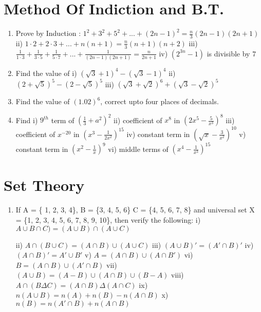 \documentclass[14pt]{article}
\begin{document}
\begin{multicols}{2}
\section{Method Of Indiction and B.T.}
\noindent
\begin{enumerate}[resume]


\item Prove by Induction : $1^2+3^2+5^2+...+(2n-1)^2 = \frac{n}{3}(2n-1)(2n+1)$ ii) $1\cdot2+2\cdot3+...+n(n+1) = \frac{n}{3}(n+1)(n+2)$ iii) $\frac{1}{1\cdot3}+\frac{1}{3\cdot5}+\frac{1}{5\cdot7}+...+\frac{1}{(2n-1)(2n+1)} = \frac{n}{2n+1}$ iv) $(2^{3n}-1)$ is divisible by 7

\item Find the value of i) $\left(\sqrt{3}+1\right)^4 - \left(\sqrt{3}-1\right)^4$ 
ii) $\left(2+\sqrt{5}\right)^5 - \left(2 -\sqrt{5}\right)^5$ iii) $\left(\sqrt{3}+\sqrt{2}\right)^6 + \left(\sqrt{3} -\sqrt{2}\right)^5$ 

\item Find the value of $(1.02)^6$, correct upto four places of decimals.

\item Find i) $9^{th}$ term of $\left(\frac{1}{3}+a^2\right)^2$ ii) coefficient of $x^8$ in $\left(2x^5 - \frac{5}{x^3}\right)^8$ iii) coefficient of $x^{-20}$ in $\left(x^3 - \frac{1}{2x^2}\right)^{15}$
iv) constant term in $\left(\sqrt{x} - \frac{3}{x^2}\right)^{10}$ v) constant term in $\left(x^2 - \frac{1}{x}\right)^9$
vi) middle terms of $\left(x^4 - \frac{1}{x^3}\right)^{15}$

\end{enumerate} 


\section{Set Theory}
\noindent
\begin{enumerate}[resume]

\item  If A = \{ 1, 2, 3, 4\}, B = \{3, 4, 5, 6\}
		  C = \{4, 5, 6, 7, 8\} and universal set  X = \{1, 2, 3, 4, 5, 6, 7, 8, 9, 10\}, then verify
the following:
i)		$ A \cup B\cap C) = (A\cup B) \cap (A \cup C)$

ii)	$A\cap (B\cup C)=(A\cap B)\cup (A \cup C)$
iii) $(A\cup B)' = (A'\cap B)'         $
iv)	$ (A\cap B)' = A'\cup B'          $
v)	$	 A = (A\cap B)\cup (A\cap B') $
vi)	$	 B = (A\cap B)\cup (A'\cap B) $
vii) $(A\cup B)=(A-B)\cup (A\cap B)\cup (B-A)$
viii)	$A \cap (B\Delta C) = (A\cap B) \Delta (A\cap C)$
ix) $n (A\cup B) = n(A) + n(B) - n(A\cap B)$ 
x) $n (B) = n(A'\cap B) + n(A\cap B)$


\end{enumerate}
\end{multicols}
\end{document}
